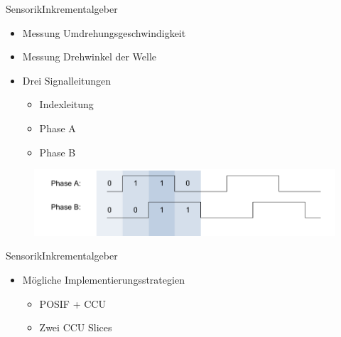 \begin{frame}{Sensorik}{Inkrementalgeber}	
 \begin{itemize}
 \item Messung Umdrehungsgeschwindigkeit
 \item Messung Drehwinkel der Welle
 \item Drei Signalleitungen
 \begin{itemize}
 \item Indexleitung
 \item Phase A
 \item Phase B
 \end{itemize}
 \end{itemize}
 \begin{figure} [htbp]
   \centering
   \includegraphics[scale=0.4]{Sensor/quadrature_overview.PNG}
 \end{figure}
\end{frame}

\begin{frame}{Sensorik}{Inkrementalgeber}	
 \begin{itemize}
 \item Mögliche Implementierungsstrategien
 \begin{itemize}
 \item POSIF + CCU
 \item Zwei CCU Slices
 \end{itemize}
 \end{itemize}
\end{frame}

